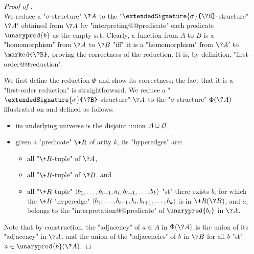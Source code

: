 \begin{proof}[Proof of ]
	\\
	We reduce a "$\sigma$-structure" $\?A$ to the
	"$\extendedSignature{\sigma}{\?B}$-structure" $\?A'$ obtained
	from $\?A$ by "interpreting@@predicate" each predicate $\unarypred{b}$ as the empty set.
	Clearly, a function from $A$ to $B$ is a "homomorphism" from $\?A$ to $\?B$
	"iff" it is a "homomorphism" from $\?A'$ to $\marked{\?B}$, proving the correctness
	of the reduction. It is, by definition, "first-order@@reduction".

	We first define the reduction $\Phi$ and show its correctness; the fact that it
	is a "first-order reduction" is straightforward.
	We reduce a "$\extendedSignature{\sigma}{\?B}$-structure" $\?A$ to the "$\sigma$-structure"
	$\Phi(\?A)$ illustrated on  and defined as follows:
	\begin{itemize}
		\item its underlying universe is the disjoint union $A \sqcup B$,
		\item given a "predicate" $\+R$ of arity $k$, its "hyperedges" are:
		\begin{itemize}
		\item all "$\+R$-tuple" of $\?A$,
		\item all "$\+R$-tuple" of $\?B$, and
		\item all "$\+R$-tuple" $\langle b_1,\dotsc,b_{i-1}, a_i, b_{i+1},\dotsc,b_k\rangle$
			"st" there exists $b_i$ for which the $\+R$-"hyperedge"
			$\langle b_1,\dotsc,b_{i-1}, b_i, b_{i+1},\dotsc,b_k\rangle$
			is in $\+R(\?B)$, and $a_i$ belongs to the "interpretation@@predicate" of 
			$\unarypred{b_i}$ in $\?A$.
		\end{itemize}
	\end{itemize}
	Note that by construction, the "adjacency" of $a \in A$ in $\Phi(\?A)$ is
	the union of its "adjacency" in $\?A$, and the union of the "adjacencies" of
	$b$ in $\?B$ for all $b$ "st" $a \in \unarypred{b}(\?A)$.


\end{proof}
